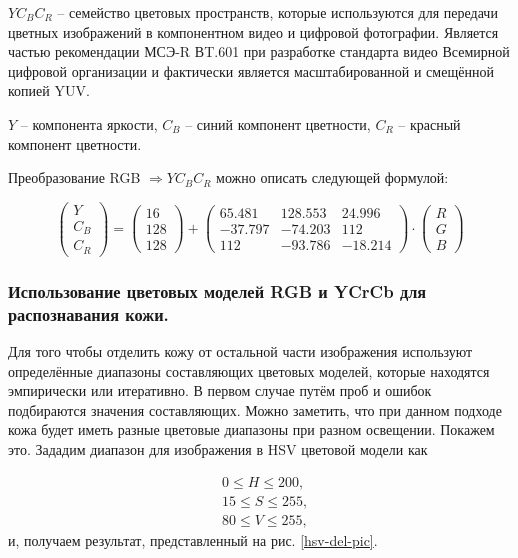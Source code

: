 $YC_BC_R$ -- семейство цветовых пространств, которые используются для передачи цветных
изображений в компонентном видео и цифровой фотографии. Является частью рекомендации 
МСЭ-R ВT.601 при разработке стандарта видео Всемирной цифровой организации и фактически
является масштабированной и смещённой копией YUV. 

$Y$ -- компонента яркости, $C_B$ -- синий компонент цветности, $C_R$ -- красный компонент
цветности.

Преобразование RGB $\Rightarrow YC_BC_R$ можно описать следующей
формулой:

\begin{equation}
\begin{pmatrix} Y \\ C_B \\ C_R \end{pmatrix}
=
\begin{pmatrix} 16 \\ 128 \\ 128 \end{pmatrix} + 
\begin{pmatrix}
	65.481 & 128.553 & 24.996\\
	-37.797 & -74.203 & 112\\
	112 & -93.786 & -18.214
\end{pmatrix}
\cdot
\begin{pmatrix} R \\ G \\ B\end{pmatrix}
\label{rgb-to-ycbcr}
\end{equation}

\subsubsection{Использование цветовых моделей RGB и YCrCb для 
распознавания кожи.}

Для того чтобы отделить кожу от остальной части изображения 
используют определённые диапазоны составляющих цветовых моделей, 
которые находятся эмпирически или итеративно. В первом случае путём 
проб и ошибок подбираются значения составляющих. Можно заметить,
что при данном подходе кожа будет иметь разные цветовые диапазоны
при разном освещении. Покажем это. Зададим диапазон для 
изображения в HSV цветовой модели как

$$
\begin{aligned}
	&0 \leq H \leq 200, \\
	&15 \leq S \leq 255, \\
	&80 \leq V \leq 255,
\end{aligned}
$$
и, получаем результат, представленный на рис. \ref{hsv-del-pic}.

